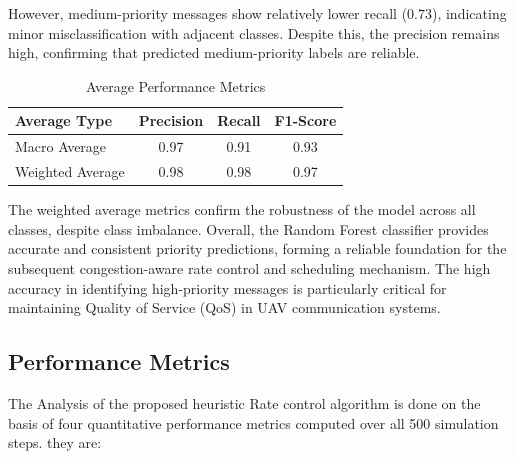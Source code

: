 \documentclass[pdflatex,sn-mathphys-num]{sn-jnl}%
\theoremstyle{thmstyleone}%
\theoremstyle{thmstyletwo}%
\theoremstyle{thmstylethree}%
\begin{document}
However, medium-priority messages show relatively lower recall (0.73), indicating minor misclassification with adjacent classes. Despite this, the precision remains high, confirming that predicted medium-priority labels are reliable.

\begin{table}[h]
\centering
\caption{Average Performance Metrics}
\label{tab:average_metrics}
\begin{tabular}{|l|c|c|c|}
\hline
\textbf{Average Type} & \textbf{Precision} & \textbf{Recall} & \textbf{F1-Score} \\
\hline
Macro Average & 0.97 & 0.91 & 0.93 \\
Weighted Average & 0.98 & 0.98 & 0.97 \\
\hline
\end{tabular}
\end{table}

The weighted average metrics confirm the robustness of the model across all classes, despite class imbalance. Overall, the Random Forest classifier provides accurate and consistent priority predictions, forming a reliable foundation for the subsequent congestion-aware rate control and scheduling mechanism. The high accuracy in identifying high-priority messages is particularly critical for maintaining Quality of Service (QoS) in UAV communication systems.







\subsection{Performance Metrics }
The Analysis of the proposed heuristic Rate control algorithm is done on the basis of four quantitative performance metrics computed over all 500 simulation steps.
they are: \\ 
\end{document}
